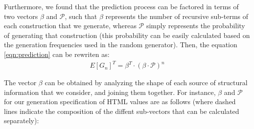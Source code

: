 Furthermore, we found that the prediction process can be factored in terms of
two vectors $\beta$ and $\mathcal{P}$, such that $\beta$ represents the number
of recursive sub-terms of each construction that we generate, whereas
$\mathcal{P}$ simply represents the probability of generating that construction
(this probability can be easily calculated based on the generation frequencies
used in the random generator).
%
Then, the equation \ref{eqn:prediction} can be rewriten as:
%
\begin{align*}
  E[G_n]^T = \beta^T \cdot (\beta \cdot \mathcal{P})^{n}
\end{align*}

The vector $\beta$ can be obtained by analyzing the shape of each source of
structural information that we consider, and joining them together.
%
For instance, $\beta$ and $\mathcal{P}$ for our generation specification of HTML
values are as follows (where dashed lines indicate the composition of the
diffent sub-vectors that can be calculated separately):


